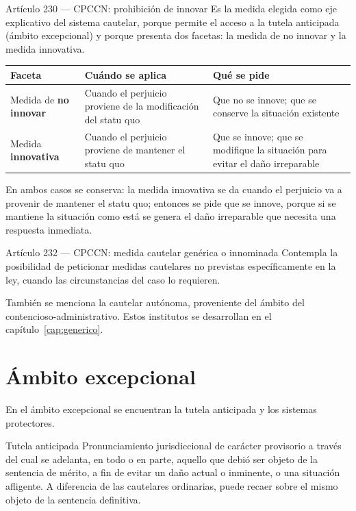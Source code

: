 \documentclass[12pt,oneside]{book}
\begin{document}
\begin{normativa}{Artículo 230 --- CPCCN: prohibición de innovar}
Es la medida elegida como eje explicativo del sistema cautelar, porque permite el acceso a la tutela anticipada (ámbito excepcional) y porque presenta dos facetas: la medida de no innovar y la medida innovativa.
\end{normativa}

\begin{table}[H]
\centering
\small
\begin{tabularx}{\textwidth}{>{\raggedright\arraybackslash}p{} Y Y}
\toprule
\textbf{Faceta} & \textbf{Cuándo se aplica} & \textbf{Qué se pide} \\
\midrule
Medida de \textbf{no innovar} & Cuando el perjuicio proviene de la modificación del statu quo & Que no se innove; que se conserve la situación existente \\
Medida \textbf{innovativa} & Cuando el perjuicio proviene de mantener el statu quo & Que se innove; que se modifique la situación para evitar el daño irreparable \\
\bottomrule
\end{tabularx}
\end{table}

En ambos casos se conserva: la medida innovativa se da cuando el perjuicio va a provenir de mantener el statu quo; entonces se pide que se innove, porque si se mantiene la situación como está se genera el daño irreparable que necesita una respuesta inmediata.

\begin{normativa}{Artículo 232 --- CPCCN: medida cautelar genérica o innominada}
Contempla la posibilidad de peticionar medidas cautelares no previstas específicamente en la ley, cuando las circunstancias del caso lo requieren.
\end{normativa}

También se menciona la cautelar autónoma, proveniente del ámbito del contencioso-administrativo. Estos institutos se desarrollan en el capítulo~\ref{cap:generico}.

\section{Ámbito excepcional}

En el ámbito excepcional se encuentran la tutela anticipada y los sistemas protectores.

\begin{definition}{Tutela anticipada}
Pronunciamiento jurisdiccional de carácter provisorio a través del cual se adelanta, en todo o en parte, aquello que debió ser objeto de la sentencia de mérito, a fin de evitar un daño actual o inminente, o una situación afligente. A diferencia de las cautelares ordinarias, puede recaer sobre el mismo objeto de la sentencia definitiva.
\end{definition}
\end{document}
